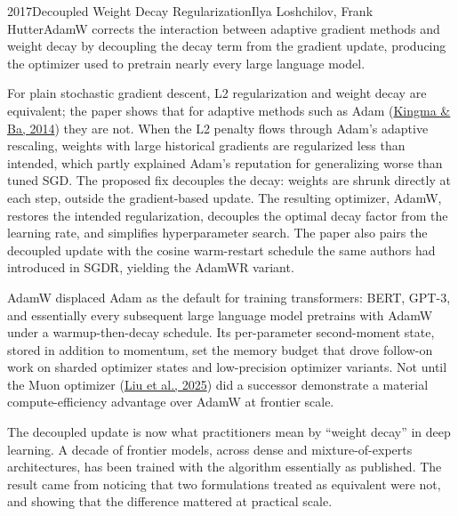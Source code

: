 
\begin{papersummary}{2017}{Decoupled Weight Decay Regularization}{Ilya Loshchilov, Frank Hutter}{AdamW corrects the interaction between adaptive gradient methods and weight decay by decoupling the decay term from the gradient update, producing the optimizer used to pretrain nearly every large language model.}

For plain stochastic gradient descent, L2 regularization and weight decay are equivalent; the paper shows that for adaptive methods such as Adam (\hyperref[paper:kingma-ba-2014]{Kingma \& Ba, 2014}) they are not. When the L2 penalty flows through Adam's adaptive rescaling, weights with large historical gradients are regularized less than intended, which partly explained Adam's reputation for generalizing worse than tuned SGD. The proposed fix decouples the decay: weights are shrunk directly at each step, outside the gradient-based update. The resulting optimizer, AdamW, restores the intended regularization, decouples the optimal decay factor from the learning rate, and simplifies hyperparameter search. The paper also pairs the decoupled update with the cosine warm-restart schedule the same authors had introduced in SGDR, yielding the AdamWR variant.

AdamW displaced Adam as the default for training transformers: BERT, GPT-3, and essentially every subsequent large language model pretrains with AdamW under a warmup-then-decay schedule. Its per-parameter second-moment state, stored in addition to momentum, set the memory budget that drove follow-on work on sharded optimizer states and low-precision optimizer variants. Not until the Muon optimizer (\hyperref[paper:liu-2025-muon]{Liu et al., 2025}) did a successor demonstrate a material compute-efficiency advantage over AdamW at frontier scale.

The decoupled update is now what practitioners mean by ``weight decay'' in deep learning. A decade of frontier models, across dense and mixture-of-experts architectures, has been trained with the algorithm essentially as published. The result came from noticing that two formulations treated as equivalent were not, and showing that the difference mattered at practical scale.

\end{papersummary}
